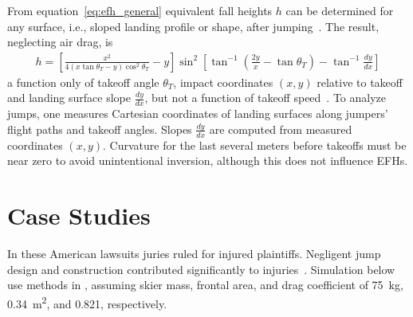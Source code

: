 \documentclass[smallextended]{svjour3}       %
\begin{document}
From equation~\ref{eq:efh_general} equivalent fall heights $h$ can be
determined for any surface, i.e., sloped landing profile or shape, after
jumping~\cite{Petrone2017}. The result, neglecting air drag, is
%
\begin{align}
  h = \left[\frac{x^2}{4(x\tan\theta_T - y)\cos^{2}\theta_T} - y\right]
    \sin^{2}
    \left[\tan^{-1}\left(\frac{2y}{x} - \tan\theta_T\right) -
    \tan^{-1}\frac{dy}{dx}\right]
  \label{eq:efh}
\end{align}
%
a function only of takeoff angle $\theta_T$,  impact coordinates $(x,y)$ relative 
to takeoff and landing surface slope $\frac{dy}{dx}$, but
not a function of takeoff speed~\cite{Petrone2017}. 
To analyze jumps, one measures Cartesian coordinates of landing surfaces along
jumpers' flight paths and takeoff angles. Slopes $\frac{dy}{dx}$ are computed
from measured coordinates $(x,y)$. Curvature for the last several meters before
takeoffs must be near zero to avoid unintentional inversion, although this does
not influence EFHs.

\section{Case Studies}
\label{sec:case}
%
In these American lawsuits juries ruled for injured plaintiffs. Negligent jump
design and construction contributed significantly to
injuries~\cite{SuperiorCourtSanFranciscoCounty2002,KingCountySuperiorCourt2008}.
Simulation below use methods in \cite{Levy2015}, assuming skier mass, frontal
area, and drag coefficient of 75~\si{\kg}, 0.34~\si{\meter\squared}, and 0.821,
respectively.
\end{document}

